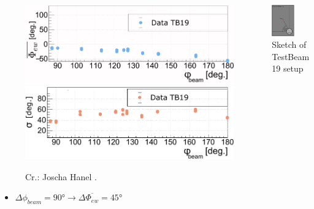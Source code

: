 \documentclass[aspectratio=169]{beamer}
\begin{document}
	\begin{frame}
		\centering
		
		\begin{columns}
			\begin{column}{0.6\textwidth}
				\begin{figure}
					\caption{Cr.: Joscha Hanel \cite{HANEL}.}
					\vspace{-.2cm}
					\includegraphics[width=1.\textwidth]{pictures/hanel_phi-ew.pdf}
					\includegraphics[width=1.\textwidth]{pictures/hanel_phi-std.pdf}
				\end{figure}
				\vspace{-.2cm}
				\begin{itemize}
					\item $\Delta \phi_{beam} = \ang{90} \rightarrow \Delta \overline{\Phi_{ew}} = \ang{45}$
				\end{itemize}
			\end{column}
		
			\begin{column}{0.5\textwidth}
				\centering
				\includegraphics[width=0.6\textwidth]{pictures/testbeam.pdf}\\
				Sketch of TestBeam19 setup
			\end{column}
		

\end{columns}
\end{frame}
\end{document}

